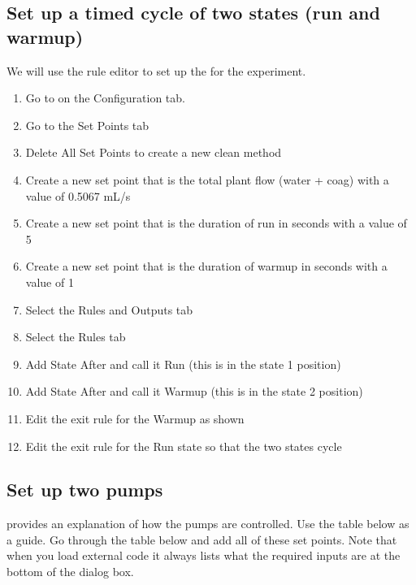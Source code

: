 \documentclass[letterpaper,10pt,english]{sphinxmanual}
\begin{document}
\subsection{Set up a timed cycle of two states (run and warmup)}
\label{\detokenize{ProCoDA/ProCoDA:set-up-a-timed-cycle-of-two-states-run-and-warmup}}
We will use the rule editor to set up the {\hyperref[\detokenize{ProCoDA/ProCoDA:heading-procoda-logic}]{}} for the experiment.
\begin{enumerate}
\item {} 
Go to  on the Configuration tab.

\item {} 
Go to the Set Points tab

\item {} 
Delete All Set Points to create a new clean method

\item {} 
Create a new set point that is the total plant flow (water + coag) with a value of 0.5067 mL/s

\item {} 
Create a new set point that is the duration of run in seconds with a value of 5

\item {} 
Create a new set point that is the duration of warmup in seconds with a value of 1 

\item {} 
Select the Rules and Outputs tab

\item {} 
Select the Rules tab

\item {} 
Add State After and call it Run (this is in the state 1 position)

\item {} 
Add State After and call it Warmup (this is in the state 2 position)

\item {} 
Edit the exit rule for the Warmup as shown 

\item {} 
Edit the exit rule for the Run state so that the two states cycle

\end{enumerate}


\subsection{Set up two pumps}
\label{\detokenize{ProCoDA/ProCoDA:set-up-two-pumps}}
{\hyperref[\detokenize{ProCoDA/ProCoDA:heading-procoda-golander-peristaltic-pump}]{}} provides an explanation of how the pumps are controlled. Use the table below as a guide. Go through the table below and add all of these set points. Note that when you load external code it always lists what the required inputs are at the bottom of the dialog box.
\end{document}
